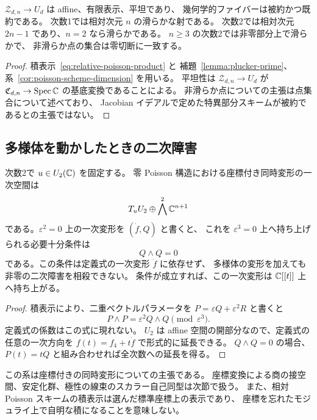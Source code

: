 \begin{corollary}[平坦性と相対的な特異点]
\label{cor:relative-flatness}
$\mathcal Z_{d,n}\to U_d$ は affine、有限表示、平坦であり、
幾何学的ファイバーは被約かつ既約である。
次数1では相対次元 $n$ の滑らかな射である。
次数2では相対次元 $2n-1$ であり、$n=2$ なら滑らかである。
$n\geq3$ の次数2では非零部分上で滑らかで、
非滑らか点の集合は零切断に一致する。
\end{corollary}

\begin{proof}
積表示~\eqref{eq:relative-poisson-product} と
補題~\ref{lemma:plucker-prime}、系~\ref{cor:poisson-scheme-dimension} を用いる。
平坦性は $\mathcal Z_{d,n}\to U_d$ が $\mathfrak C_{d,n}\to\operatorname{Spec}\mathbb C$
の基底変換であることによる。
非滑らか点についての主張は点集合について述べており、
Jacobian イデアルで定めた特異部分スキームが被約であるとの主張ではない。
\end{proof}

\subsection{多様体を動かしたときの二次障害}

\begin{corollary}
\label{cor:relative-deformations}
次数2で $u\in U_2(\mathbb C)$ を固定する。
零 Poisson 構造における座標付き同時変形の一次空間は
\[
 T_uU_2\oplus\bigwedge^2\mathbb C^{n+1}
\]
である。$\varepsilon^2=0$ 上の一次変形を $(\dot f,Q)$ と書くと、
これを $\varepsilon^3=0$ 上へ持ち上げられる必要十分条件は
\[
 Q\wedge Q=0
\]
である。この条件は定義式の一次変形 $\dot f$ に依存せず、
多様体の変形を加えても非零の二次障害を相殺できない。
条件が成立すれば、この一次変形は $\mathbb C[[t]]$ 上へ持ち上がる。
\end{corollary}

\begin{proof}
積表示により、二重ベクトルパラメータを
$P=\varepsilon Q+\varepsilon^2R$ と書くと
\[
 P\wedge P=\varepsilon^2Q\wedge Q\pmod{\varepsilon^3}.
\]
定義式の係数はこの式に現れない。
$U_2$ は affine 空間の開部分なので、定義式の任意の一次方向を
$f(t)=f_4+t\dot f$ で形式的に延長できる。
$Q\wedge Q=0$ の場合、$P(t)=tQ$ と組み合わせれば全次数への延長を得る。
\end{proof}

この系は座標付きの同時変形についての主張である。
座標変換による商の接空間、安定化群、極性の線束のスカラー自己同型は次節で扱う。
また、相対 Poisson スキームの積表示は選んだ標準座標上の表示であり、
座標を忘れたモジュライ上で自明な積になることを意味しない。

